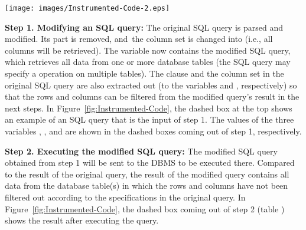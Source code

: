 

\begin{figure*}[tbp]
  \centering
  \texttt{[image: images/Instrumented-Code-2.eps]}\\
  \caption{Instrumented code to monitor the execution of SQL queries~\cite{icsm13}}\label{fig:Instrumented-Code}
\end{figure*}


\vspace{0.04in}
\textbf{Step 1. Modifying an SQL query:}
The original SQL query is parsed and modified. Its
 part is removed, and~the column set is changed into 
(i.e., all columns will be retrieved). The  variable
now contains the modified SQL query, which retrieves all data from one
or more database tables (the SQL query may specify a 
operation on multiple tables). The  clause and the column
set in the original SQL query are also extracted out (to the variables
 and , respectively) so that the
rows and columns can be filtered from the modified query's result in
the next steps. In Figure~\ref{fig:Instrumented-Code}, the dashed box
at the top shows an example of an SQL query that is the input of step
1. The values of the three variables ,
, and  are shown in the dashed boxes
coming out of step 1, respectively.




\vspace{0.04in}
\textbf{Step 2. Executing the modified SQL query:}
The modified SQL query obtained from step 1 will be sent to the DBMS
to be executed there. Compared to the result of the original query,
the result of the modified query contains all data from the database
table(s) in which the rows and columns have not been filtered out
according to the specifications in the original query. In
Figure~\ref{fig:Instrumented-Code}, the dashed box coming out of step
2 (table ) shows the result after executing the
 query.

